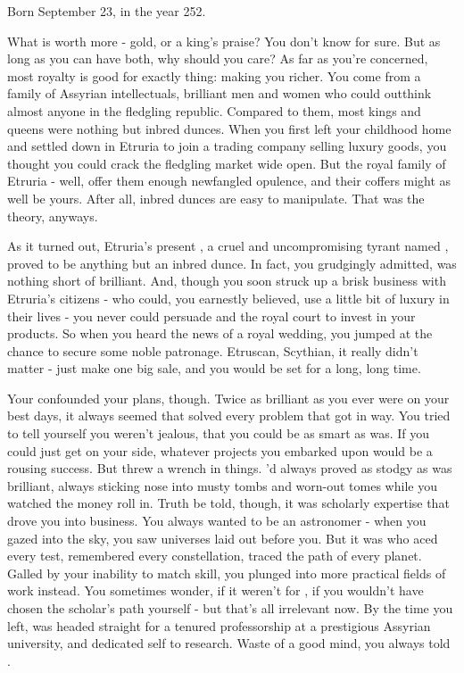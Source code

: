 \documentclass[char]{Kos}
\begin{document}
\name{\cMerchant{}}

Born September 23, in the year 252.

What is worth more - gold, or a king's praise? You don't know for sure. But as long as you can have both, why should you care? As far as you're concerned, most royalty is good for exactly thing: making you richer. You come from a family of Assyrian intellectuals, brilliant men and women who could outthink almost anyone in the fledgling republic. Compared to them, most kings and queens were nothing but inbred dunces. When you first left your childhood home and settled down in Etruria to join a trading company selling luxury goods, you thought you could crack the fledgling market wide open. But the royal family of Etruria - well, offer them enough newfangled opulence, and their coffers might as well be yours. After all, inbred dunces are easy to manipulate. That was the theory, anyways. 

As it turned out, Etruria's present \cEtruriaKing{\monarch}, a cruel and uncompromising tyrant named \cEtruriaKing{}, proved to be anything but an inbred dunce. In fact, you grudgingly admitted, \cEtruriaKing{\they} was nothing short of brilliant. And, though you soon struck up a brisk business with Etruria's citizens - who could, you earnestly believed, use a little bit of luxury in their lives - you never could persuade \cEtruriaKing{} and the royal court to invest in your products. So when you heard the news of a royal wedding, you jumped at the chance to secure some noble patronage. Etruscan, Scythian, it really didn't matter - just make one big sale, and you would be set for a long, long time.

Your \cAnarchist{\sibling} \cAnarchist{} confounded your plans, though. Twice as brilliant as you ever were on your best days, it always seemed that \cAnarchist{\they} solved every problem that got in \cAnarchist{\their} way. You tried to tell yourself you weren't jealous, that you could be as smart as \cAnarchist{\they} was. If you could just get \cAnarchist{\them} on your side, whatever projects you embarked upon would be a rousing success. But \cAnarchist{\they} threw a wrench in things. \cAnarchist{\they}'d always proved as stodgy as \cAnarchist{\they} was brilliant, always sticking \cAnarchist{\their} nose into musty tombs and worn-out tomes while you watched the money roll in. Truth be told, though, it was \cAnarchist{\their} scholarly expertise that drove you into business. You always wanted to be an astronomer - when you gazed into the sky, you saw universes laid out before you. But it was \cAnarchist{} who aced every test, remembered every constellation, traced the path of every planet. Galled by your inability to match \cAnarchist{\their} skill, you plunged into more practical fields of work instead. You sometimes wonder, if it weren't for \cAnarchist{}, if you wouldn't have chosen the scholar's path yourself - but that's all irrelevant now. By the time you left, \cAnarchist{\they} was headed straight for a tenured professorship at a prestigious Assyrian university, and dedicated \cAnarchist{\them}self to research. Waste of a good mind, you always told \cAnarchist{\them}.
\end{document}
